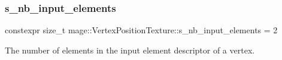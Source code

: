 \subsubsection{\texorpdfstring{s\+\_\+nb\+\_\+input\+\_\+elements}{s\_nb\_input\_elements}}
{\footnotesize\ttfamily constexpr size\+\_\+t mage\+::\+Vertex\+Position\+Texture\+::s\+\_\+nb\+\_\+input\+\_\+elements = 2\hspace{0.3cm}{\ttfamily [static]}}

The number of elements in the input element descriptor of a vertex. 